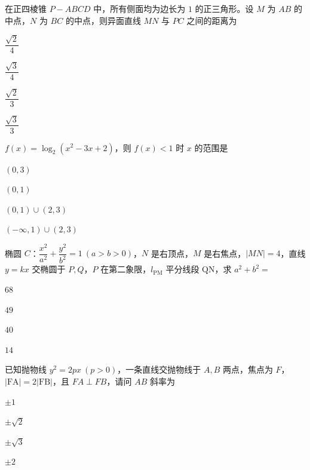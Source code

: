 \documentclass{exam-zh}
\begin{document}
\begin{question}
在正四棱锥 $P-ABCD$ 中，所有侧面均为边长为 $1$ 的正三角形。设 $M$ 为 $AB$ 的中点，$N$ 为 $BC$ 的中点，则异面直线 $MN$ 与 $PC$ 之间的距离为 \paren[]
\begin{choices}
  \item $\dfrac{\sqrt{2}}{4}$
  \item $\dfrac{\sqrt{3}}{4}$
  \item $\dfrac{\sqrt{2}}{3}$
  \item $\dfrac{\sqrt{3}}{3}$
\end{choices}
\end{question}

\begin{question}
$f(x)=\log_2(x^2-3x+2)$，则 $f(x)<1$ 时 $x$ 的范围是 \paren[]
\begin{choices}
  \item $(0,3)$
  \item $(0,1)$
  \item $(0,1)\cup(2,3)$
  \item $(-\infty,1)\cup(2,3)$
\end{choices}
\end{question}

\begin{question}
椭圆 $C$：$\dfrac{x^2}{a^2}+\dfrac{y^2}{b^2}=1\ (a>b>0)$，$N$ 是右顶点，$M$ 是右焦点，$|MN|=4$，直线 $y=kx$ 交椭圆于 $P,Q$，$P$ 在第二象限，$l_{\mathrm{PM}}$ 平分线段 $\mathrm{QN}$，求 $a^2+b^2=$ \paren[]
\begin{choices}
  \item $68$
  \item $49$
  \item $40$
  \item $14$
\end{choices}
\end{question}

\begin{question}
已知抛物线 $y^2=2px\ (p>0)$，一条直线交抛物线于 $A,B$ 两点，焦点为 $F$，$|\mathrm{FA}|=2|\mathrm{FB}|$，且 $FA\perp FB$，请问 $AB$ 斜率为 \paren[]
\begin{choices}
  \item $\pm 1$
  \item $\pm\sqrt{2}$
  \item $\pm\sqrt{3}$
  \item $\pm 2$
\end{choices}
\end{question}
\end{document}
